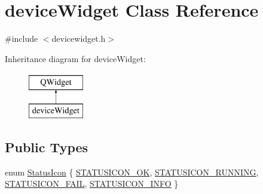 \hypertarget{classdevice_widget}{\section{device\-Widget Class Reference}
\label{classdevice_widget}
}


{\ttfamily \#include $<$devicewidget.\-h$>$}

Inheritance diagram for device\-Widget\-:\begin{figure}[H]
\begin{center}
\leavevmode
\includegraphics[height=2.000000cm]{classdevice_widget}
\end{center}
\end{figure}
\subsection*{Public Types}
\begin{DoxyCompactItemize}
\item 
enum \hyperlink{group___y_modem_uploader_ga788236c4f7d8fe7586489a183528d657}{Status\-Icon} \{ \hyperlink{group___y_modem_uploader_gga788236c4f7d8fe7586489a183528d657a8bca9ffd7e0d28d471e8b3f6aa52120c}{S\-T\-A\-T\-U\-S\-I\-C\-O\-N\-\_\-\-O\-K}, 
\hyperlink{group___y_modem_uploader_gga788236c4f7d8fe7586489a183528d657a9930ae1923857bf1f78907ee4bb3baaa}{S\-T\-A\-T\-U\-S\-I\-C\-O\-N\-\_\-\-R\-U\-N\-N\-I\-N\-G}, 
\hyperlink{group___y_modem_uploader_gga788236c4f7d8fe7586489a183528d657a72975044b2bc8aa1b97b1bd730059025}{S\-T\-A\-T\-U\-S\-I\-C\-O\-N\-\_\-\-F\-A\-I\-L}, 
\hyperlink{group___y_modem_uploader_gga788236c4f7d8fe7586489a183528d657a7e4049feafb5e7f932619e41afda5257}{S\-T\-A\-T\-U\-S\-I\-C\-O\-N\-\_\-\-I\-N\-F\-O}
 \}
\end{DoxyCompactItemize}

